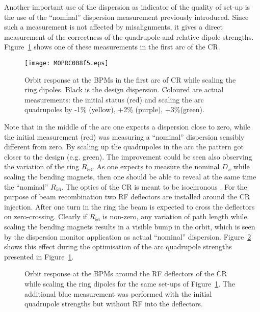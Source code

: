 Another important use of the dispersion as indicator of the quality of set-up is the use of 
the ``nominal'' dispersion measurement previously introduced.
Since such a measurement is not affected by misalignments, it gives a direct measurement of 
the correctness of the quadrupole and relative dipole strengths.
Figure~\ref{fig:CRfirstarc} shows one of these measurements in the first arc of the CR.
%
\begin{figure}[!htb]
   \centering
   \texttt{[image: MOPRC008f5.eps]}
   \caption{Orbit response at the BPMs in the first arc of CR while scaling the ring dipoles.
   Black is the design dispersion.
   Coloured are actual measurements: the initial status (red) and scaling the arc quadrupoles by 
   -1\% (yellow), +2\% (purple), +3\%(green).}
   \label{fig:CRfirstarc}
\end{figure}
%
Note that in the middle of the arc one expects a dispersion close to zero, while the initial measurement (red) 
was measuring a ``nominal'' dispersion sensibly different from zero.
By scaling up the quadrupoles in the arc the pattern got closer to the design (e.g. green).
The improvement could be seen also observing the variation of the ring $R_{56}$.
As one expects to measure the nominal $D_x$ while scaling the bending magnets,
then one should be able to reveal at the same time the ``nominal'' $R_{56}$.
The optics of the CR is meant to be isochronous \cite{bib:CTF3DesignReport}.
For the purpose of beam recombination two RF deflectors are installed around the CR injection. 
After one turn in the ring the beam is expected to cross the deflectors on zero-crossing. 
Clearly if $R_{56}$ is non-zero, any variation of path length while scaling the bending magnets results in 
a visible bump in the orbit, which is seen by the dispersion monitor application as actual ``nominal'' dispersion.
Figure~\ref{fig:CRRFbump} shows this effect during the optimisation of the arc quadrupole strengths presented in 
Figure~\ref{fig:CRfirstarc}.
%
\begin{figure}[!htb]
\centering
   \caption{Orbit response at the BPMs around the RF deflectors of the CR while scaling the ring dipoles for 
            the same set-ups of Figure~\ref{fig:CRfirstarc}.
            The additional blue measurement was performed with the initial quadrupole strengths but 
            without RF into the deflectors.}
   \label{fig:CRRFbump}
\end{figure}
